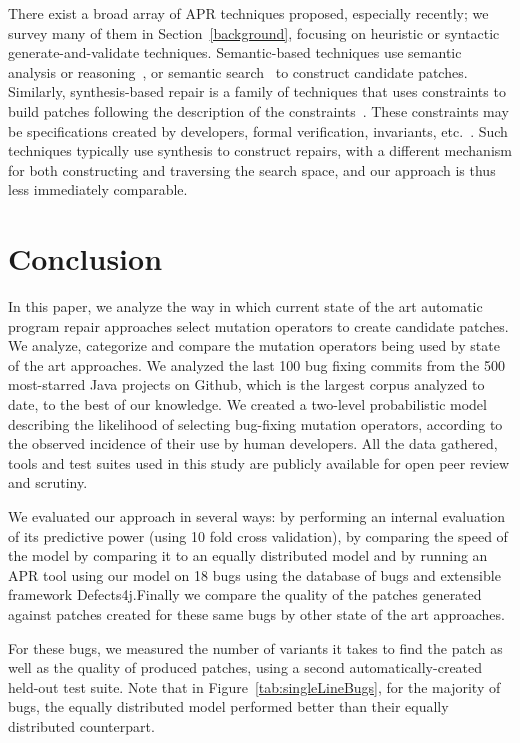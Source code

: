 \documentclass[conference]{IEEEtran}
\begin{document}
There exist a broad array of APR techniques proposed, especially recently; we
survey many of them in Section~\ref{background}, focusing on heuristic or
syntactic generate-and-validate techniques.  Semantic-based techniques use
semantic analysis or reasoning~\cite{nguyen13,mechtaev15,Mechtaev2016}, or
semantic search~\cite{ke15} to construct candidate patches.  Similarly,
synthesis-based repair is a family of techniques that uses constraints to build
patches following the description of the constraints~\cite{jin11,wei10}. These constraints may be
specifications created by developers, formal verification, invariants,
etc.~\cite{jin11,wei10}.  Such techniques typically use synthesis to construct
repairs, with a different mechanism for both constructing and traversing the
search space, and our approach is thus less immediately comparable.
 

\section{Conclusion} \label{conclusion}

In this paper, we analyze the way in which current state of the art automatic 
program repair approaches select mutation operators to create candidate 
patches. We analyze, categorize and compare the mutation operators being used by 
state of the art approaches. We analyzed the last 100 bug fixing commits from 
the
500 most-starred Java projects on Github, which is the largest corpus analyzed
to date, to the best of our knowledge.  We created a two-level probabilistic 
model describing
the likelihood of selecting bug-fixing mutation operators, according to the
observed incidence of their use by human developers. All the data gathered, 
tools and test suites used in this study are publicly available for open peer review 
and scrutiny.

We evaluated our approach in several ways: by performing an internal 
evaluation of 
its predictive power (using 10 fold cross 
validation), by comparing the speed of the model by comparing it to an equally 
distributed model and by
 running an APR tool using our model on 18 bugs using the database of bugs and extensible 
framework Defects4j.Finally we compare the quality of the patches 
generated against patches created for these same bugs by other state of the art 
approaches. 

For these bugs, we measured the number of variants it takes to find the 
patch as well as the quality of produced patches, using a second 
automatically-created held-out test suite.
Note that in Figure~\ref{tab:singleLineBugs}, for the majority of bugs, the 
equally distributed model performed better than their equally distributed 
counterpart.
\end{document}
